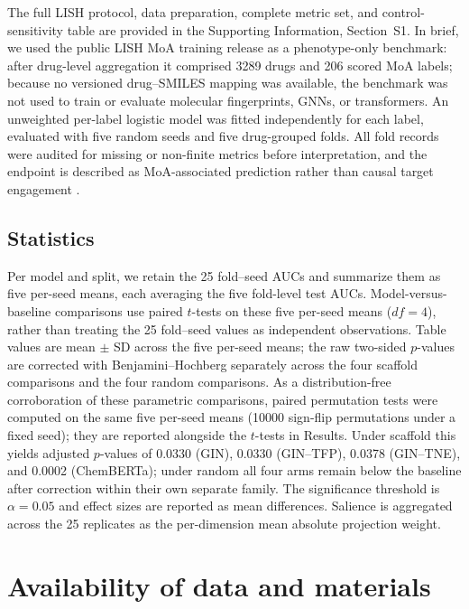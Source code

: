 \documentclass[11pt,a4paper]{article}
\begin{document}
The full LISH protocol, data preparation, complete metric set, and control-sensitivity table are provided in the Supporting Information, Section~S1. In brief, we used the public LISH MoA training release as a phenotype-only benchmark: after drug-level aggregation it comprised \num{3289} drugs and \num{206} scored MoA labels; because no versioned drug--SMILES mapping was available, the benchmark was not used to train or evaluate molecular fingerprints, GNNs, or transformers. An unweighted per-label logistic model was fitted independently for each label, evaluated with five random seeds and five drug-grouped folds. All fold records were audited for missing or non-finite metrics before interpretation, and the endpoint is described as MoA-associated prediction rather than causal target engagement \citep{Trapotsi2022MoA}.

\subsection{Statistics}

Per model and split, we retain the \num{25} fold--seed AUCs and summarize them as five per-seed means, each averaging the five fold-level test AUCs. Model-versus-baseline comparisons use paired $t$-tests on these five per-seed means ($df=4$), rather than treating the \num{25} fold--seed values as independent observations. Table values are mean $\pm$ SD across the five per-seed means; the raw two-sided $p$-values are corrected with Benjamini--Hochberg separately across the four scaffold comparisons and the four random comparisons. As a distribution-free corroboration of these parametric comparisons, paired permutation tests were computed on the same five per-seed means (\num{10000} sign-flip permutations under a fixed seed); they are reported alongside the $t$-tests in Results. Under scaffold this yields adjusted $p$-values of \num{0.0330} (GIN), \num{0.0330} (GIN--TFP), \num{0.0378} (GIN--TNE), and \num{0.0002} (ChemBERTa); under random all four arms remain below the baseline after correction within their own separate family. The significance threshold is $\alpha=\num{0.05}$ and effect sizes are reported as mean differences. Salience is aggregated across the \num{25} replicates as the per-dimension mean absolute projection weight.

\section*{Availability of data and materials}
\end{document}
